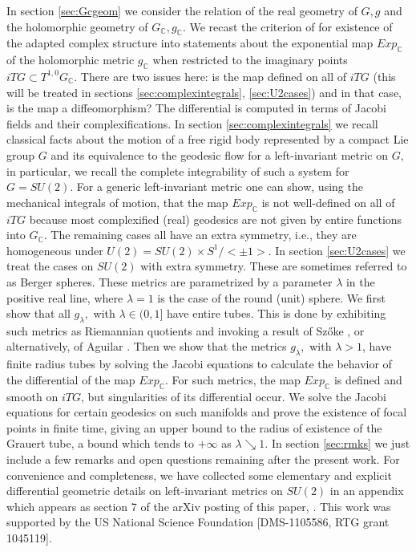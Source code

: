\documentclass[12pt,reqno]{amsart}\usepackage{amssymb,amsmath,amscd,epsfig,amsthm,enumerate,import,eufrak}
\theoremstyle{definition}
\theoremstyle{remark}
\numberwithin{equation}{section}
\theoremstyle{plain}
\theoremstyle{definition}
\def \c {\mathbb{C}}
\def \vs {\vskip 2mm}
\theoremstyle{remark}
\numberwithin{theorem}{section}
\begin{document}
\vs
%
In section {\ref{sec:Gcgeom}} we consider the relation of the real geometry of $G, g$ and the holomorphic geometry of $G_{\c}, g_{\c}$. We recast the criterion of \cite{ls} for existence of the adapted complex structure into statements about the exponential map $Exp_{\c}$ of the holomorphic metric $g_{\c}$ when restricted to the imaginary points $i TG \subset T^{1,0}G_{\c}$. There are two issues here: is the map defined on all of $i TG$ (this will be treated in sections \ref{sec:complexintegrals}, \ref{sec:U2cases}) and in that case, is the map a diffeomorphism? The differential is computed in terms of Jacobi fields and their complexifications.
%
\vs
%
In section \ref{sec:complexintegrals} we recall classical facts about the motion of a free rigid body represented by a compact Lie group $G$ and its equivalence to the geodesic flow for a left-invariant metric on $G$, in particular, we recall the complete integrability of such a system for $G = SU(2)$. For a generic left-invariant metric one can show, using the mechanical integrals of motion, that the map $Exp_{\c}$ is not well-defined on all of $i TG$ because most complexified (real) geodesics are not given by entire functions into $G_{\c}$. The remaining cases all have an extra symmetry, i.e., they are homogeneous under $U(2) = SU(2) \times S^1/ <\pm 1 >$.
\vs
%
In section \ref{sec:U2cases} we treat the cases on $SU(2)$ with extra symmetry. These are sometimes referred to as Berger spheres. These metrics are parametrized by a parameter $\lambda$ in the positive real line, where $\lambda = 1$ is the case of the round (unit) sphere. We first show that all $g_{\lambda},$ with $\lambda \in (0,1]$ have entire tubes. This is done by exhibiting such metrics as Riemannian quotients and invoking a result of Sz\H{o}ke \cite{s2}, or alternatively, of Aguilar \cite{a1}. Then we show that the metrics $g_{\lambda},$ with $\lambda > 1$, have finite radius tubes by solving the Jacobi equations to calculate the behavior of the differential of the map $Exp_{\c}$. For such metrics, the map $Exp_{\c}$ is defined and smooth on $i TG$, but singularities of its differential occur. We solve the Jacobi equations for certain geodesics on such manifolds and prove the existence of focal points in finite time, giving an upper bound to the radius of existence of the Grauert tube, a bound which tends to $+\infty$ as $\lambda \searrow 1$.
\vs
%
%
In section \ref{sec:rmks} we just include a few remarks and open questions remaining after the present work. 
\vs
%
For convenience and completeness, we have collected some elementary and explicit differential geometric details on left-invariant metrics on $SU(2)$ in an appendix which appears as section 7 of the arXiv posting of this paper, \cite{web}.
\vs
This work was supported by the US National Science Foundation [DMS-1105586, RTG grant 1045119].
\end{document}
